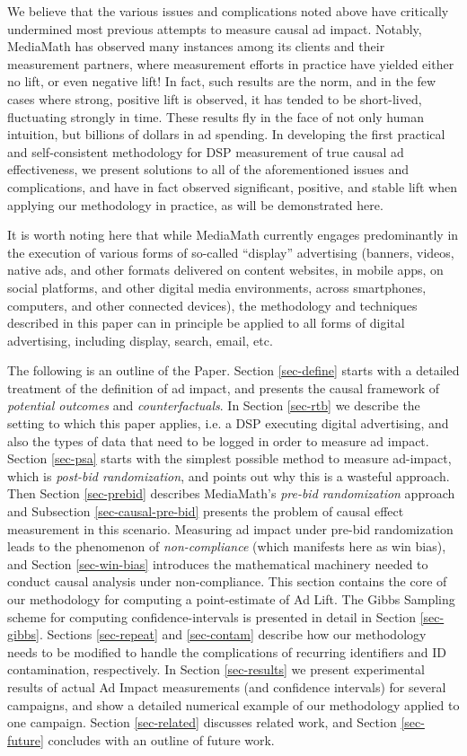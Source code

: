 \documentclass[11pt,a4paper]{article}
\theoremstyle{definition}
\theoremstyle{remark}
\theoremstyle{definition}
\theoremstyle{definition}
\theoremstyle{definition}
\theoremstyle{definition}
\theoremstyle{definition}
\theoremstyle{definition}
\begin{document}
We believe that the various issues and complications noted above have critically undermined most previous attempts to measure causal ad impact. Notably, MediaMath has observed many instances among its clients and their measurement partners, where measurement efforts in practice have yielded either no lift, or even negative lift! In fact, such results are the norm, and in the few cases where strong, positive lift is observed, it has tended to be short-lived, fluctuating strongly in time. These  results fly in the face of not only human intuition, but billions of dollars in ad spending. In developing the first practical and self-consistent methodology for DSP measurement of true causal ad effectiveness, we present solutions to all of the aforementioned issues and complications, and have in fact observed significant, positive, and stable lift when applying our methodology in practice, as will be demonstrated here.

It is worth noting here that while MediaMath currently engages predominantly in the execution of various forms of so-called “display” advertising (banners, videos, native ads, and other formats delivered on content websites, in mobile apps, on social platforms, and other digital media environments, across smartphones, computers, and other connected devices), the methodology and techniques described in this paper can in principle be applied to all forms of digital advertising, including display, search, email, etc.

The following is an outline of the Paper. Section \ref{sec-define} starts with a detailed treatment of the definition of ad impact, and presents the causal framework of \textit{potential outcomes} and \textit{counterfactuals}. 
In Section \ref{sec-rtb} we describe the setting to which this paper applies, i.e. a DSP executing digital advertising, and also the types of data that need to be logged in order to measure ad impact.
Section \ref{sec-psa} starts with the simplest possible method to measure ad-impact, which is \textit{post-bid randomization}, and points out why this is a wasteful approach.
Then Section \ref{sec-prebid} describes MediaMath's  \textit{pre-bid randomization} approach and Subsection \ref{sec-causal-pre-bid} presents the problem of causal effect measurement in this scenario. Measuring ad impact under pre-bid randomization leads to the phenomenon of \textit{non-compliance} (which manifests here as win bias),
and Section \ref{sec-win-bias} introduces the mathematical machinery 
needed to conduct causal analysis under non-compliance. 
This section contains the core of our methodology for computing a point-estimate of Ad Lift. 
The Gibbs Sampling scheme for computing confidence-intervals is presented in detail in Section \ref{sec-gibbs}. 
Sections \ref{sec-repeat} and \ref{sec-contam} describe how our methodology needs to be modified to handle the complications of recurring identifiers and ID contamination, respectively. 
In Section \ref{sec-results} we present experimental results of actual Ad Impact measurements (and confidence intervals) for several campaigns, and show a detailed numerical example of our methodology applied to one campaign.
Section \ref{sec-related} discusses related work, and  
Section \ref{sec-future} concludes with an outline of future work.
\end{document}
